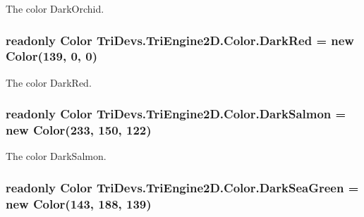 The color Dark\-Orchid. 

\hypertarget{struct_tri_devs_1_1_tri_engine2_d_1_1_color_a88c65c8fafb453ec786842e75f30116f}{
\subsubsection[{Dark\-Red}]{\setlength{\rightskip}{0pt plus 5cm}readonly {\bf Color} Tri\-Devs.\-Tri\-Engine2\-D.\-Color.\-Dark\-Red = new {\bf Color}(139, 0, 0)\hspace{0.3cm}{\ttfamily [static]}}}\label{struct_tri_devs_1_1_tri_engine2_d_1_1_color_a88c65c8fafb453ec786842e75f30116f}


The color Dark\-Red. 

\hypertarget{struct_tri_devs_1_1_tri_engine2_d_1_1_color_aeb469a9cc10d291d91b305229df2f5b1}{
\subsubsection[{Dark\-Salmon}]{\setlength{\rightskip}{0pt plus 5cm}readonly {\bf Color} Tri\-Devs.\-Tri\-Engine2\-D.\-Color.\-Dark\-Salmon = new {\bf Color}(233, 150, 122)\hspace{0.3cm}{\ttfamily [static]}}}\label{struct_tri_devs_1_1_tri_engine2_d_1_1_color_aeb469a9cc10d291d91b305229df2f5b1}


The color Dark\-Salmon. 

\hypertarget{struct_tri_devs_1_1_tri_engine2_d_1_1_color_a8c13de23b87138591e56c8432d10fee5}{
\subsubsection[{Dark\-Sea\-Green}]{\setlength{\rightskip}{0pt plus 5cm}readonly {\bf Color} Tri\-Devs.\-Tri\-Engine2\-D.\-Color.\-Dark\-Sea\-Green = new {\bf Color}(143, 188, 139)\hspace{0.3cm}{\ttfamily [static]}}}\label{struct_tri_devs_1_1_tri_engine2_d_1_1_color_a8c13de23b87138591e56c8432d10fee5}


